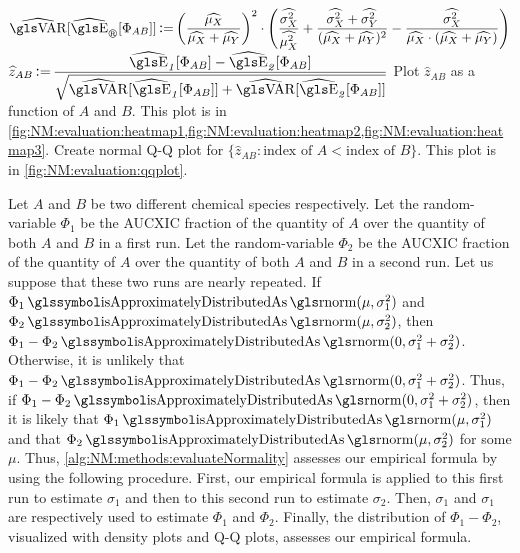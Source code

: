 \begin{algorithm}
\begin{algorithmic}[1]
		\State \( \displaystyle\widehat{\VAR}[{\widehat\E}_\SX[\Phi_{AB}]] 
					\getsvalueof \left(\frac{\widehat{\mu_X}}{\widehat{\mu_X}+\widehat{\mu_Y}}\right)^2 \cdot 
					\left(\frac{\widehat{\sigma_X^2}}{\widehat{\mu_X^2}} + \frac{\widehat{\sigma_X^2}+\widehat{\sigma_Y^2}}{(\widehat{\mu_X}+\widehat{\mu_Y})^2} - 
					\frac{\widehat{\sigma_X^2}}{\widehat{\mu_X}\cdot(\widehat{\mu_X}+{\widehat{\mu_Y}})}\right) \) 
	\EndFor
\EndFor
{}
	\State \(\displaystyle\widehat{z}_{AB} 
	       \getsvalueof \frac{\widehat{\E}_\SA[\Phi_{AB}] - \widehat{\E}_\SB[\Phi_{AB}]}
	                         {\sqrt{\widehat{\VAR}[{\widehat\E}_\SA[\Phi_{AB}]]+\widehat{\VAR}[{\widehat\E}_\SB[\Phi_{AB}]]}}\)
\EndFor
\State Plot \(\widehat{z}_{AB}\) as a function of \(A\) and \(B\). 
		This plot is in \cref{fig:NM:evaluation:heatmap1,fig:NM:evaluation:heatmap2,fig:NM:evaluation:heatmap3}.
\State Create normal Q-Q plot for \(\{\widehat{z}_{AB}: \text{index of } A < \text{index of } B\}\).
		This plot is in \cref{fig:NM:evaluation:qqplot}.
\end{algorithmic}
\end{algorithm}
Let \(A\) and \(B\) be two different chemical species respectively.
Let the random-variable \(\Phi_1\) be the \gls{AUCXIC} fraction of the quantity of \(A\) over the quantity of both \(A\) and \(B\) in a first  run. 
Let the random-variable \(\Phi_2\) be the \gls{AUCXIC} fraction of the quantity of \(A\) over the quantity of both \(A\) and \(B\) in a second run.
Let us suppose that these two runs are nearly repeated.
If \(\Phi_1\isappdistas\rnorm(\mu, \sigma_1^2)\) and \(\Phi_2\isappdistas\rnorm(\mu, \sigma_2^2)\),
	then \(\Phi_1-\Phi_2 \isappdistas \rnorm(0, \sigma_1^2+\sigma_2^2)\).
Otherwise, it is unlikely that \(\Phi_1-\Phi_2 \isappdistas\rnorm(0, \sigma_1^2+\sigma_2^2)\).
Thus, if \(\Phi_1-\Phi_2 \isappdistas \rnorm(0, \sigma_1^2+\sigma_2^2)\),
	then it is likely that \(\Phi_1\isappdistas\rnorm(\mu, \sigma_1^2)\) and that \(\Phi_2\isappdistas\rnorm(\mu, \sigma_2^2)\) for some \(\mu\).
Thus, \cref{alg:NM:methods:evaluateNormality} assesses our empirical formula by using the following procedure.
First, our empirical formula is applied to this first run to estimate \(\sigma_1\) and then to this second run to estimate \(\sigma_2\).
Then, \(\sigma_1\) and \(\sigma_1\) are respectively used to estimate \(\Phi_1\) and \(\Phi_2\).
Finally, the distribution of \(\Phi_1-\Phi_2\), visualized with density plots and Q-Q plots, assesses our empirical formula.

